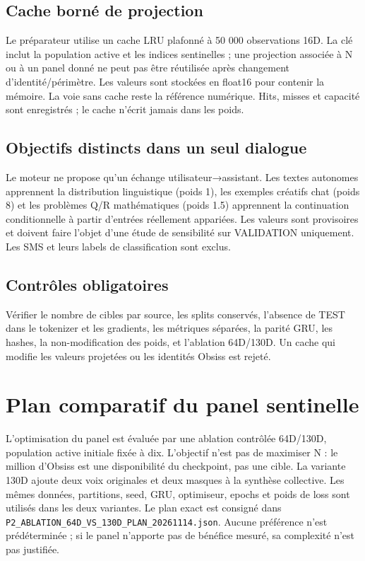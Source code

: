 \documentclass[11pt,a4paper]{report}
\begin{document}
\section{Cache borné de projection}
Le préparateur utilise un cache LRU plafonné à 50 000 observations 16D. La clé inclut la population active et les indices sentinelles ; une projection associée à N ou à un panel donné ne peut pas être réutilisée après changement d'identité/périmètre. Les valeurs sont stockées en float16 pour contenir la mémoire. La voie sans cache reste la référence numérique. Hits, misses et capacité sont enregistrés ; le cache n'écrit jamais dans les poids.
\section{Objectifs distincts dans un seul dialogue}
Le moteur ne propose qu'un échange utilisateur→assistant. Les textes autonomes apprennent la distribution linguistique (poids 1), les exemples créatifs chat (poids 8) et les problèmes Q/R mathématiques (poids 1.5) apprennent la continuation conditionnelle à partir d'entrées réellement appariées. Les valeurs sont provisoires et doivent faire l'objet d'une étude de sensibilité sur VALIDATION uniquement. Les SMS et leurs labels de classification sont exclus.
\section{Contrôles obligatoires}
Vérifier le nombre de cibles par source, les splits conservés, l'absence de TEST dans le tokenizer et les gradients, les métriques séparées, la parité GRU, les hashes, la non-modification des poids, et l'ablation 64D/130D. Un cache qui modifie les valeurs projetées ou les identités Obsiss est rejeté.


\chapter{Plan comparatif du panel sentinelle}
L'optimisation du panel est évaluée par une ablation contrôlée 64D/130D, population active initiale fixée à dix. L'objectif n'est pas de maximiser N : le million d'Obsiss est une disponibilité du checkpoint, pas une cible. La variante 130D ajoute deux voix originales et deux masques à la synthèse collective. Les mêmes données, partitions, seed, GRU, optimiseur, epochs et poids de loss sont utilisés dans les deux variantes. Le plan exact est consigné dans \texttt{P2\_ABLATION\_64D\_VS\_130D\_PLAN\_20261114.json}. Aucune préférence n'est prédéterminée ; si le panel n'apporte pas de bénéfice mesuré, sa complexité n'est pas justifiée.
\end{document}
